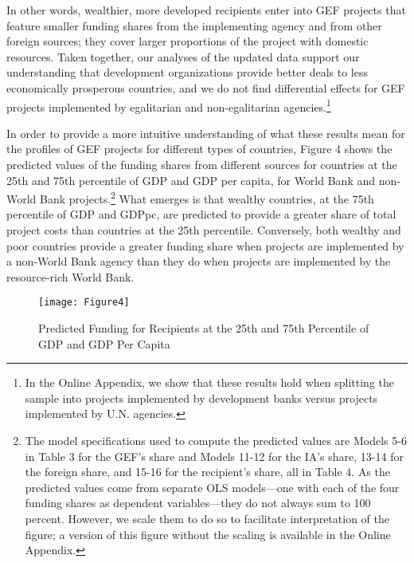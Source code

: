 \documentclass{article}
\begin{document}
In other words, wealthier, more developed recipients enter into GEF projects that feature smaller funding shares from the implementing agency and from other foreign sources; they cover larger proportions of the project with domestic resources.  Taken together, our analyses of the updated data support our understanding that development organizations provide better deals to less economically prosperous countries, and we do not find differential effects for GEF projects implemented by egalitarian and non-egalitarian agencies.\footnote{In the Online Appendix, we show that these results hold when splitting the sample into projects implemented by development banks versus projects implemented by U.N. agencies.} 

In order to provide a more intuitive understanding of what these results mean for the profiles of GEF projects for different types of countries, Figure 4 shows the predicted values of the funding shares from different sources for countries at the 25th and 75th percentile of GDP and GDP per capita, for World Bank and non-World Bank projects.\footnote{The model specifications used to compute the predicted values are Models 5-6 in Table 3 for the GEF’s share and Models 11-12 for the IA’s share, 13-14 for the foreign share, and 15-16 for the recipient’s share, all in Table 4. As the predicted values come from separate OLS models---one with each of the four funding shares as dependent variables---they do not always sum to 100 percent. However, we scale them to do so to facilitate interpretation of the figure; a version of this figure without the scaling is available in the Online Appendix.}  What emerges is that wealthy countries, at the 75th percentile of GDP and GDPpc, are predicted to provide a greater share of total project costs than countries at the 25th percentile. Conversely, both wealthy and poor countries provide a greater funding share when projects are implemented by a non-World Bank agency than they do when projects are implemented by the resource-rich World Bank.  

\begin{figure}[H]
	\centering
	\caption{Predicted Funding for Recipients at the 25th and 75th Percentile of GDP and GDP Per Capita}
	\texttt{[image: Figure4]}
	\label{fig:figure4}
\end{figure}
\end{document}
